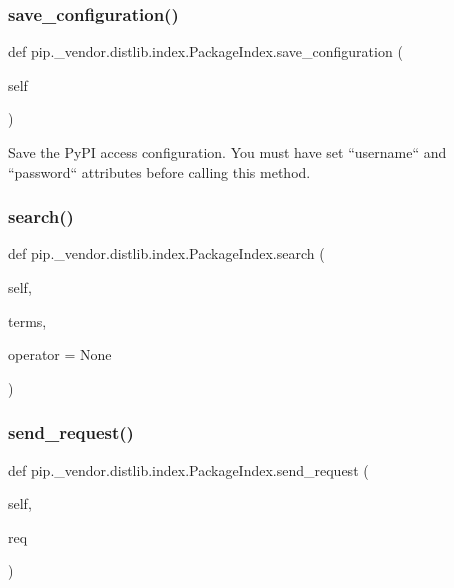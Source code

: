 \subsubsection{\texorpdfstring{save\+\_\+configuration()}{save\_configuration()}}
{\footnotesize\ttfamily def pip.\+\_\+vendor.\+distlib.\+index.\+Package\+Index.\+save\+\_\+configuration (\begin{DoxyParamCaption}\item[{}]{self }\end{DoxyParamCaption})}

\begin{DoxyVerb}Save the PyPI access configuration. You must have set ``username`` and
``password`` attributes before calling this method.
\end{DoxyVerb}
 \mbox{\label{classpip_1_1__vendor_1_1distlib_1_1index_1_1PackageIndex_a997a8e0cea9a01f10a0e1466ed503bee}} 
\subsubsection{\texorpdfstring{search()}{search()}}
{\footnotesize\ttfamily def pip.\+\_\+vendor.\+distlib.\+index.\+Package\+Index.\+search (\begin{DoxyParamCaption}\item[{}]{self,  }\item[{}]{terms,  }\item[{}]{operator = {\ttfamily None} }\end{DoxyParamCaption})}

\mbox{\label{classpip_1_1__vendor_1_1distlib_1_1index_1_1PackageIndex_a57f63332fa0eab5204874d167d751e70}} 
\subsubsection{\texorpdfstring{send\+\_\+request()}{send\_request()}}
{\footnotesize\ttfamily def pip.\+\_\+vendor.\+distlib.\+index.\+Package\+Index.\+send\+\_\+request (\begin{DoxyParamCaption}\item[{}]{self,  }\item[{}]{req }\end{DoxyParamCaption})}

